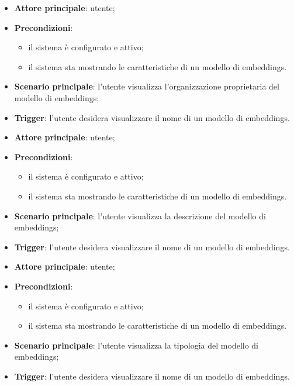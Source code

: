 \documentclass[10pt, a4paper]{article}
\begin{document}
    \begin{itemize}
        \item \textbf{Attore principale}: utente;
        \item \textbf{Precondizioni}:
            \begin{itemize}
                \item il sistema è configurato e attivo;
                \item il sistema sta mostrando le caratteristiche di un modello di embeddings.
            \end{itemize}
        \item \textbf{Scenario principale}: l'utente visualizza l'organizzazione proprietaria del modello di embeddings;
        \item \textbf{Trigger}: l’utente desidera visualizzare il nome di un modello di embeddings.
    \end{itemize}

    \begin{itemize}
        \item \textbf{Attore principale}: utente;
        \item \textbf{Precondizioni}:
            \begin{itemize}
                \item il sistema è configurato e attivo;
                \item il sistema sta mostrando le caratteristiche di un modello di embeddings.
            \end{itemize}
        \item \textbf{Scenario principale}: l'utente visualizza la descrizione del modello di embeddings;
        \item \textbf{Trigger}: l’utente desidera visualizzare il nome di un modello di embeddings.
    \end{itemize}

    \begin{itemize}
        \item \textbf{Attore principale}: utente;
        \item \textbf{Precondizioni}:
            \begin{itemize}
                \item il sistema è configurato e attivo;
                \item il sistema sta mostrando le caratteristiche di un modello di embeddings.
            \end{itemize}
        \item \textbf{Scenario principale}: l'utente visualizza la tipologia del modello di embeddings;
        \item \textbf{Trigger}: l’utente desidera visualizzare il nome di un modello di embeddings.
    \end{itemize}
\end{document}
